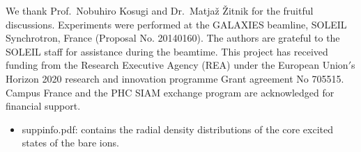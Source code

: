 \documentclass[journal=jacsat,manuscript=article]{achemso}
\begin{document}





\begin{acknowledgement}


We thank Prof.\ Nobuhiro Kosugi and Dr.\ Matja\v{z} \v{Z}itnik for the fruitful discussions. Experiments were performed at the GALAXIES beamline, SOLEIL Synchrotron, France (Proposal No. 20140160). The authors are grateful to the SOLEIL staff for assistance during the beamtime. This project has received funding from the Research Executive Agency (REA) under the European Union$'$s Horizon 2020 research and innovation programme Grant agreement No 705515. Campus France and the PHC SIAM exchange program are acknowledged for financial support.

\end{acknowledgement}

\begin{suppinfo}

\begin{itemize}
  \item suppinfo.pdf: contains the radial density distributions of the core excited states of the bare ions.
\end{itemize}

\end{suppinfo}


\end{document}
